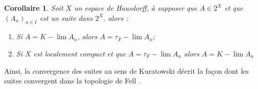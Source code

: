 \documentclass[11pt]{report}
\newenvironment{boxcorollaire}
{\begin{tcolorbox}
		[enhanced jigsaw,breakable,pad at break*=1mm,
		colback=black!5!white,boxrule=0pt,frame hidden,
		borderline east={1.5mm}{-2mm}{blue}]}
	{\end{tcolorbox}}
\theoremstyle{styletheorem}
\newtheorem{corollary}[theoreme]{Corollaire}
\theoremstyle{styledef}
\theoremstyle{remark}
\newenvironment{corollaire}{\begin{boxcorollaire}\begin{corollary}}{\end{corollary}\end{boxcorollaire}}
\begin{document}
\begin{corollaire}
	Soit $X$ un espace de Hausdorff, à supposer que $A \in 2^X$ et que $(A_n)_{n \in I}$ est un suite dans $2^X$. alors :
	\begin{enumerate}
		\item Si $A = K-\lim A_n$, alors $A= \tau_F-\lim A_n$;
		
		\item Si $X$ est localement compact et que $ A =\tau_F-\lim A_n$ alors $A = K-\lim A_n$
	\end{enumerate}
\end{corollaire}
Ainsi, la convergence des suites au sens de Kuratowski décrit la façon dont les suites convergent dans la topologie de Fell \cite{b8,b20}.\\
\end{document}
